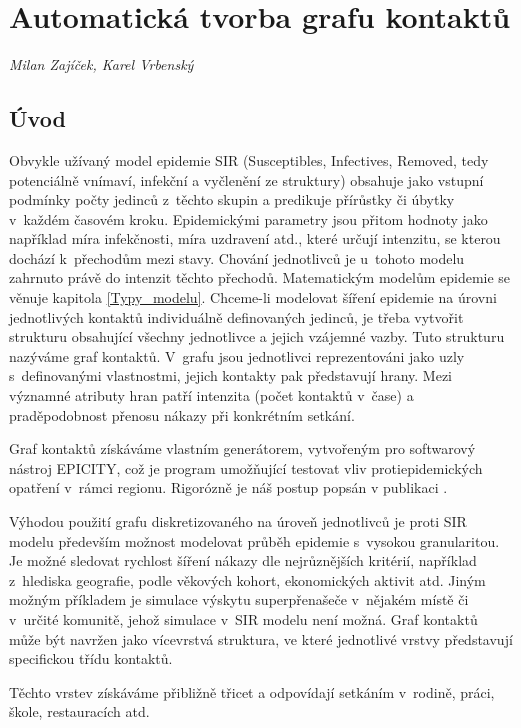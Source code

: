 
\chapter{Automatická tvorba grafu kontaktů}\label{Grafy_kontaktu}

\textit{Milan Zajíček, Karel Vrbenský}
\vspace{15mm}

\section*{Úvod}

Obvykle užívaný model epidemie SIR (Susceptibles, Infectives, Removed, tedy potenciálně vnímaví, infekční a vyčlenění ze struktury) obsahuje jako vstupní podmínky počty jedinců z~těchto skupin a predikuje přírůstky či úbytky v~každém časovém kroku. Epidemickými parametry jsou přitom hodnoty jako například míra infekčnosti, míra uzdravení atd., které určují intenzitu, se kterou dochází k~přechodům mezi stavy. Chování jednotlivců je u~tohoto modelu zahrnuto právě do intenzit těchto přechodů. Matematickým modelům epidemie se věnuje kapitola \ref{Typy_modelu}. Chceme-li modelovat šíření epidemie na úrovni jednotlivých kontaktů individuálně definovaných jedinců, je třeba vytvořit strukturu obsahující všechny jednotlivce a jejich vzájemné vazby. Tuto strukturu nazýváme graf kontaktů. V~grafu jsou jednotlivci reprezentováni jako uzly s~definovanými vlastnostmi, jejich kontakty pak představují hrany. Mezi významné atributy hran patří intenzita (počet kontaktů v~čase) a pra\-dě\-po\-dob\-nost přenosu nákazy při konkrétním setkání. 

Graf kontaktů získáváme vlastním generátorem, vytvořeným pro softwarový ná\-stroj EPICITY, což je program umožňující testovat vliv protiepidemických opatření v~rám\-ci regionu. Rigorózně je náš postup popsán v publikaci \cite{M-techrep2021}.

Výhodou použití grafu diskretizovaného na úroveň jednotlivců je proti SIR modelu především možnost modelovat průběh epidemie s~vysokou granularitou. Je možné sledovat rychlost šíření nákazy dle nejrůznějších kritérií, například z~hlediska geografie, podle věkových kohort, ekonomických aktivit atd.  Jiným možným příkladem je simulace výskytu superpřenašeče v~nějakém místě či v~určité komunitě, jehož simulace v~SIR modelu není možná.
Graf kontaktů může být navržen jako vícevrstvá struktura, ve které jednotlivé vrstvy představují specifickou třídu kontaktů. 


Těchto vrstev získáváme přibližně třicet a odpovídají setkáním v~rodině, práci, škole, restauracích atd.

